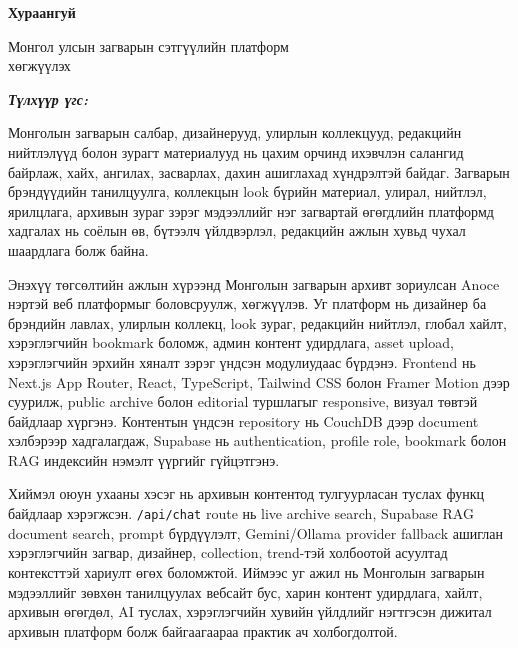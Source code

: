 

\begin{center}
{\scshape\Large \univname\par} %
{\scshape\large \facname\par}\vspace{0.5cm} %
{\huge\textbf{{Хураангуй}} \par}
\bigskip
{\Large{Монгол улсын загварын сэтгүүлийн платформ\\
хөгжүүлэх} \par} %
\bigskip

{\normalsize \shortname \par} %
\addressname
\end{center}

\textit{\textbf{Түлхүүр үгс: \keywordnames}}
\bigskip

Монголын загварын салбар, дизайнерууд, улирлын коллекцууд, редакцийн нийтлэлүүд болон зурагт материалууд нь цахим орчинд ихэвчлэн салангид байрлаж, хайх, ангилах, засварлах, дахин ашиглахад хүндрэлтэй байдаг. Загварын брэндүүдийн танилцуулга, коллекцын look бүрийн материал, улирал, нийтлэл, ярилцлага, архивын зураг зэрэг мэдээллийг нэг загвартай өгөгдлийн платформд хадгалах нь соёлын өв, бүтээлч үйлдвэрлэл, редакцийн ажлын хувьд чухал шаардлага болж байна.

Энэхүү төгсөлтийн ажлын хүрээнд Монголын загварын архивт зориулсан Anoce нэртэй веб платформыг боловсруулж, хөгжүүлэв. Уг платформ нь дизайнер ба брэндийн лавлах, улирлын коллекц, look зураг, редакцийн нийтлэл, глобал хайлт, хэрэглэгчийн bookmark боломж, админ контент удирдлага, asset upload, хэрэглэгчийн эрхийн хяналт зэрэг үндсэн модулиудаас бүрдэнэ. Frontend нь Next.js App Router, React, TypeScript, Tailwind CSS болон Framer Motion дээр суурилж, public archive болон editorial туршлагыг responsive, визуал төвтэй байдлаар хүргэнэ. Контентын үндсэн repository нь CouchDB дээр document хэлбэрээр хадгалагдаж, Supabase нь authentication, profile role, bookmark болон RAG индексийн нэмэлт үүргийг гүйцэтгэнэ.

Хиймэл оюун ухааны хэсэг нь архивын контентод тулгуурласан туслах функц байдлаар хэрэгжсэн. \texttt{/api/chat} route нь live archive search, Supabase RAG document search, prompt бүрдүүлэлт, Gemini/Ollama provider fallback ашиглан хэрэглэгчийн загвар, дизайнер, collection, trend-тэй холбоотой асуултад контексттэй хариулт өгөх боломжтой. Иймээс уг ажил нь Монголын загварын мэдээллийг зөвхөн танилцуулах вебсайт бус, харин контент удирдлага, хайлт, архивын өгөгдөл, AI туслах, хэрэглэгчийн хувийн үйлдлийг нэгтгэсэн дижитал архивын платформ болж байгаагаараа практик ач холбогдолтой.
